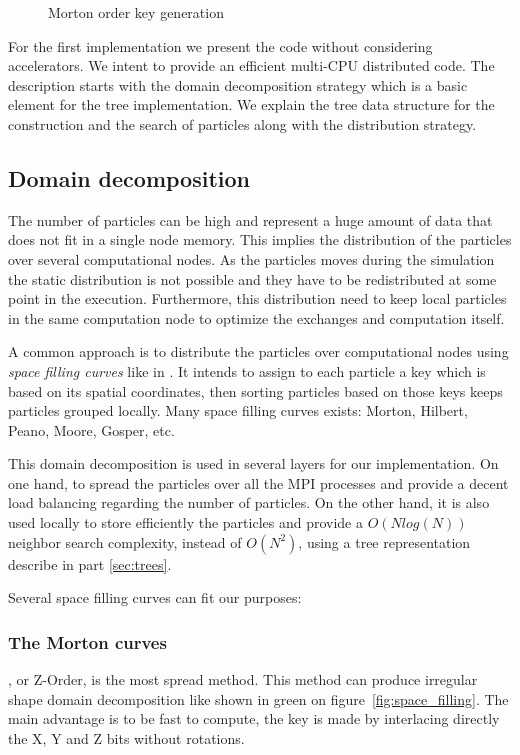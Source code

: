 \begin{figure}[t!]
\centering

\caption{Morton order key generation}
\end{figure}

For the first implementation we present the code without considering accelerators. 
We intent to provide an efficient multi-CPU distributed code. 
The description starts with the domain decomposition strategy which is a basic element for the tree implementation.
We explain the tree data structure for the construction and the search of particles along with the distribution strategy.

\subsection{Domain decomposition}
\label{sec:domain_decomposition}
The number of particles can be high and represent a huge amount of data that does not fit in a single node memory. 
This implies the distribution of the particles over several computational nodes. 
As the particles moves during the simulation the static distribution is not possible and they have to be redistributed at some point in the execution. 
Furthermore, this distribution need to keep local particles in the same computation node to optimize the exchanges and computation itself.

A common approach is to distribute the particles over computational nodes using \textit{space filling curves} like in \cite{warren20132hot,springel2005cosmological,bedorf201424}. 
It intends to assign to each particle a key which is based on its spatial coordinates, then sorting particles based on those keys keeps particles grouped locally.
Many space filling curves exists: Morton, Hilbert, Peano, Moore, Gosper, etc.\

This domain decomposition is used in several layers for our implementation. 
On one hand, to spread the particles over all the MPI processes and provide a decent load balancing regarding the number of particles. 
On the other hand, it is also used locally to store efficiently the particles and provide a $O(N log(N))$ neighbor search complexity, instead of $O(N^2)$, using a tree representation describe in part \ref{sec:trees}. 

Several space filling curves can fit our purposes:
\subsubsection*{The Morton curves} \cite{morton1966computer}, or Z-Order, is the most spread method. 
This method can produce irregular shape domain decomposition like shown in green on figure~\ref{fig:space_filling}. 
The main advantage is to be fast to compute, the key is made by interlacing directly the X, Y and Z bits without rotations. 
